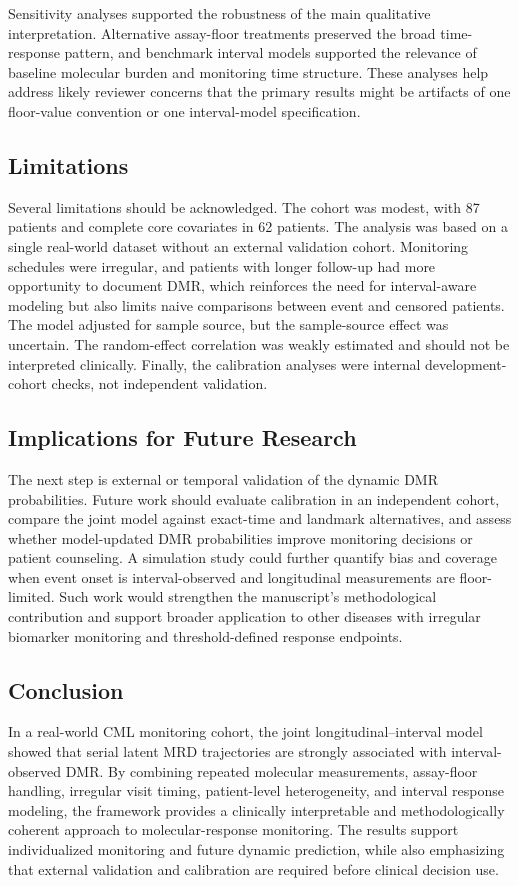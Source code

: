 Sensitivity analyses supported the robustness of the main qualitative interpretation. Alternative assay-floor treatments preserved the broad time-response pattern, and benchmark interval models supported the relevance of baseline molecular burden and monitoring time structure. These analyses help address likely reviewer concerns that the primary results might be artifacts of one floor-value convention or one interval-model specification.

\subsection{Limitations}

Several limitations should be acknowledged. The cohort was modest, with 87 patients and complete core covariates in 62 patients. The analysis was based on a single real-world dataset without an external validation cohort. Monitoring schedules were irregular, and patients with longer follow-up had more opportunity to document DMR, which reinforces the need for interval-aware modeling but also limits naive comparisons between event and censored patients. The model adjusted for sample source, but the sample-source effect was uncertain. The random-effect correlation was weakly estimated and should not be interpreted clinically. Finally, the calibration analyses were internal development-cohort checks, not independent validation.

\subsection{Implications for Future Research}

The next step is external or temporal validation of the dynamic DMR probabilities. Future work should evaluate calibration in an independent cohort, compare the joint model against exact-time and landmark alternatives, and assess whether model-updated DMR probabilities improve monitoring decisions or patient counseling. A simulation study could further quantify bias and coverage when event onset is interval-observed and longitudinal measurements are floor-limited. Such work would strengthen the manuscript's methodological contribution and support broader application to other diseases with irregular biomarker monitoring and threshold-defined response endpoints.

\subsection{Conclusion}

In a real-world CML monitoring cohort, the joint longitudinal--interval model showed that serial latent MRD trajectories are strongly associated with interval-observed DMR. By combining repeated molecular measurements, assay-floor handling, irregular visit timing, patient-level heterogeneity, and interval response modeling, the framework provides a clinically interpretable and methodologically coherent approach to molecular-response monitoring. The results support individualized monitoring and future dynamic prediction, while also emphasizing that external validation and calibration are required before clinical decision use.

